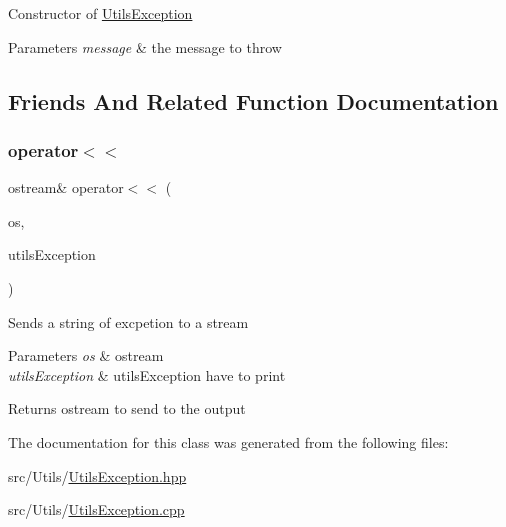 Constructor of \hyperlink{class_utils_exception}{Utils\+Exception} 
\begin{DoxyParams}{Parameters}
{\em message} & the message to throw \\
\hline
\end{DoxyParams}


\subsection{Friends And Related Function Documentation}
\hypertarget{class_utils_exception_a6ebd1d5ff627152beaa743b43fc2f9d3}{}\label{class_utils_exception_a6ebd1d5ff627152beaa743b43fc2f9d3} 
\subsubsection{\texorpdfstring{operator$<$$<$}{operator<<}}
{\footnotesize\ttfamily ostream\& operator$<$$<$ (\begin{DoxyParamCaption}\item[{ostream \&}]{os,  }\item[{const \hyperlink{class_utils_exception}{Utils\+Exception} \&}]{utils\+Exception }\end{DoxyParamCaption})\hspace{0.3cm}{\ttfamily [friend]}}

Sends a string of excpetion to a stream 
\begin{DoxyParams}{Parameters}
{\em os} & ostream \\
\hline
{\em utils\+Exception} & utils\+Exception have to print \\
\hline
\end{DoxyParams}
\begin{DoxyReturn}{Returns}
ostream to send to the output 
\end{DoxyReturn}


The documentation for this class was generated from the following files\+:\begin{DoxyCompactItemize}
\item 
src/\+Utils/\hyperlink{_utils_exception_8hpp}{Utils\+Exception.\+hpp}\item 
src/\+Utils/\hyperlink{_utils_exception_8cpp}{Utils\+Exception.\+cpp}\end{DoxyCompactItemize}
